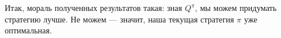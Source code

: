 Итак, мораль полученных результатов такая: зная $Q^{\pi}$, мы можем придумать стратегию лучше. Не можем --- значит, наша текущая стратегия $\pi$ уже оптимальная.





